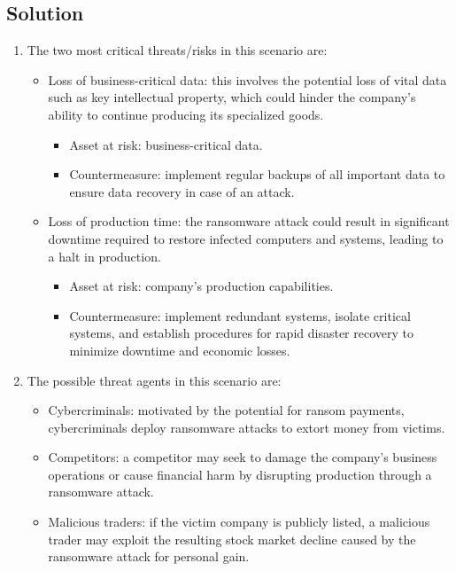\subsection*{Solution}
\begin{enumerate}
    \item The two most critical threats/risks in this scenario are:
    \begin{itemize}
        \item Loss of business-critical data: this involves the potential loss of vital data such as key intellectual property, which could hinder the company's ability to continue producing its specialized goods.
            \begin{itemize}
                \item Asset at risk: business-critical data.
                \item Countermeasure: implement regular backups of all important data to ensure data recovery in case of an attack.
            \end{itemize}
        \item Loss of production time: the ransomware attack could result in significant downtime required to restore infected computers and systems, leading to a halt in production.
            \begin{itemize}
                \item Asset at risk: company's production capabilities.
                \item Countermeasure: implement redundant systems, isolate critical systems, and establish procedures for rapid disaster recovery to minimize downtime and economic losses.
            \end{itemize}
    \end{itemize}
    \item The possible threat agents in this scenario are:
        \begin{itemize}
            \item Cybercriminals: motivated by the potential for ransom payments, cybercriminals deploy ransomware attacks to extort money from victims.
            \item Competitors: a competitor may seek to damage the company's business operations or cause financial harm by disrupting production through a ransomware attack.
            \item Malicious traders: if the victim company is publicly listed, a malicious trader may exploit the resulting stock market decline caused by the ransomware attack for personal gain.
        \end{itemize}
\end{enumerate}